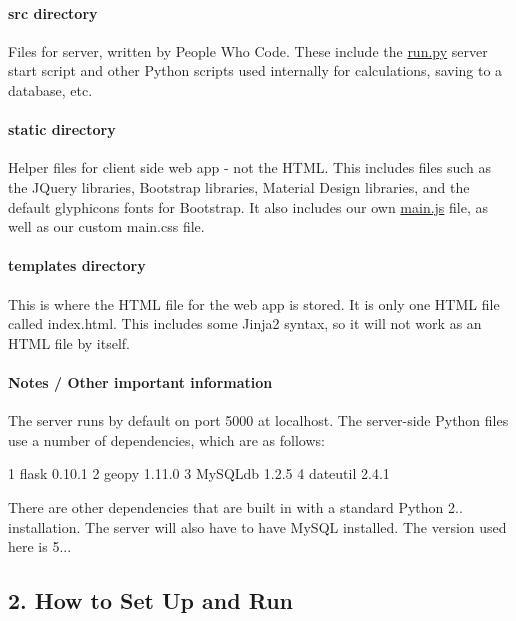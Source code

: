 \paragraph*{{\ttfamily src} directory}

Files for server, written by People Who Code. These include the \hyperlink{run_8py}{run.\+py} server start script and other Python scripts used internally for calculations, saving to a database, etc.

\paragraph*{{\ttfamily static} directory}

Helper files for client side web app -\/ not the H\+T\+ML. This includes files such as the J\+Query libraries, Bootstrap libraries, Material Design libraries, and the default glyphicons fonts for Bootstrap. It also includes our own \hyperlink{main_8js}{main.\+js} file, as well as our custom main.\+css file.

\paragraph*{{\ttfamily templates} directory}

This is where the H\+T\+ML file for the web app is stored. It is only one H\+T\+ML file called {\ttfamily index.\+html}. This includes some Jinja2 syntax, so it will not work as an H\+T\+ML file by itself.

\paragraph*{Notes / Other important information}

The server runs by default on port 5000 at localhost. The server-\/side Python files use a number of dependencies, which are as follows\+:


\begin{DoxyCode}
1 flask 0.10.1
2 geopy 1.11.0
3 MySQLdb 1.2.5
4 dateutil 2.4.1
\end{DoxyCode}
 There are other dependencies that are built in with a standard Python 2.. installation. The server will also have to have My\+S\+QL installed. The version used here is 5...

\subsection*{2. How to Set Up and Run}

